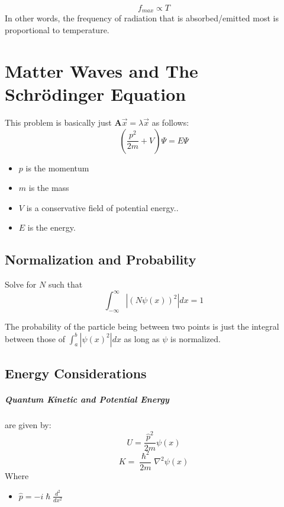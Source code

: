\documentclass[a4paper,12pt]{report}
\begin{document}
$$f_{max} \propto T$$
In other words, the frequency of radiation that is absorbed/emitted most is proportional to temperature.



\chapter{Matter Waves and The Schrödinger Equation}
This problem is basically just $\pmb{A}\vec{x} = \lambda \vec{x}$ as follows:
$$(\frac{p^2}{2m} + V) \Psi = E\Psi$$
\begin{itemize}
\item $p$ is the momentum
\item $m$ is the mass
\item $V$ is a conservative field of potential energy..
\item $E$ is the energy.
\end{itemize}

\section{Normalization and Probability}
Solve for $N$ such that $$\int_{-\infty}^{\infty} |(N\psi(x))^2| dx = 1$$

The probability of the particle being between two points is just the integral between those of $\int_a^b |\psi(x)^2| dx$ as long as $\psi$ is 
normalized. 

\section{Energy Considerations}
\paragraph{Quantum Kinetic and Potential Energy} are given by: $$U = \frac{\hat{p}^2}{2m}\psi(x)$$
$$K = \frac{\hslash^2}{2m}\nabla^2\psi(x)$$
Where
\begin{itemize}
\item $\hat{p} = -i\hslash \frac{d^2}{dx^2}$
\end{itemize}
\end{document}
